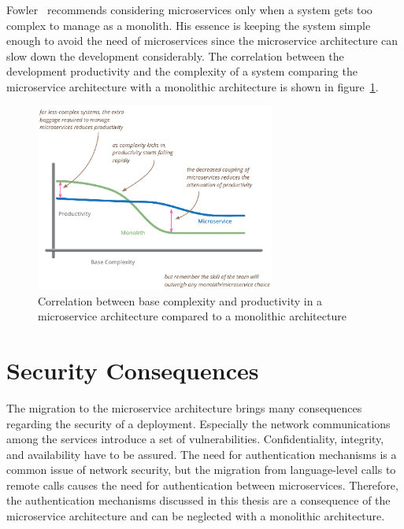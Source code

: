Fowler~\cite{fowlerpremium} recommends considering microservices only when a system gets too complex to manage as a monolith.
His essence is keeping the system simple enough to avoid the need of microservices since the microservice architecture can slow down the development considerably.
The correlation between the development productivity and the complexity of a system comparing the microservice architecture with a monolithic architecture is shown in figure~\ref{fig:fowler_productivity}.

\begin{figure}[H]
    \centering
    \includegraphics[width=0.7\textwidth]{./images/microservice_architecture/fowler-productivity-complexity.png}
    \caption{Correlation between base complexity and productivity in a microservice architecture compared to a monolithic architecture~\cite{fowlerpremium}}
    \label{fig:fowler_productivity}
\end{figure}

\section{Security Consequences}
The migration to the microservice architecture brings many consequences regarding the security of a deployment.
Especially the network communications among the services introduce a set of vulnerabilities.
Confidentiality, integrity, and availability have to be assured.
The need for authentication mechanisms is a common issue of network security, but the migration from language-level calls to remote calls causes the need for authentication between microservices.
Therefore, the authentication mechanisms discussed in this thesis are a consequence of the microservice architecture and can be neglected with a monolithic architecture.
